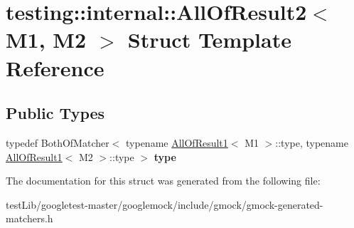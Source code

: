 \hypertarget{structtesting_1_1internal_1_1AllOfResult2}{}\section{testing\+:\+:internal\+:\+:All\+Of\+Result2$<$ M1, M2 $>$ Struct Template Reference}
\label{structtesting_1_1internal_1_1AllOfResult2}
\subsection*{Public Types}
\begin{DoxyCompactItemize}
\item 
\mbox{\label{structtesting_1_1internal_1_1AllOfResult2_adec0b0ce2fdd07d398e1fdd2cdb88392}} 
typedef Both\+Of\+Matcher$<$ typename \hyperlink{structtesting_1_1internal_1_1AllOfResult1}{All\+Of\+Result1}$<$ M1 $>$\+::type, typename \hyperlink{structtesting_1_1internal_1_1AllOfResult1}{All\+Of\+Result1}$<$ M2 $>$\+::type $>$ {\bfseries type}
\end{DoxyCompactItemize}


The documentation for this struct was generated from the following file\+:\begin{DoxyCompactItemize}
\item 
test\+Lib/googletest-\/master/googlemock/include/gmock/gmock-\/generated-\/matchers.\+h\end{DoxyCompactItemize}
